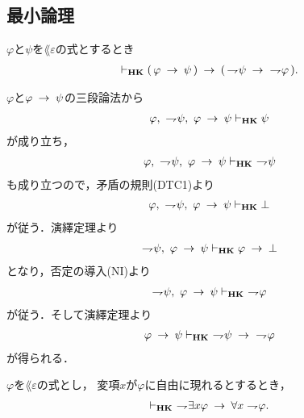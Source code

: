 \subsection{最小論理}
	\begin{screen}
		\begin{thm}[対偶律$1$]\label{classic:contraposition_1}
			$\varphi$と$\psi$を$\lang{\varepsilon}$の式とするとき
			\begin{align}
				\vdash_{{\scriptsize \mbox{{\bf HK}}}} (\, \varphi \hspace{0.25em}\rightarrow\hspace{0.25em} \psi\, )
				\hspace{0.25em}\rightarrow\hspace{0.25em} (\, \rightharpoondown\hspace{-0.25em} \psi \hspace{0.25em}\rightarrow\hspace{0.25em}\ \rightharpoondown\hspace{-0.25em} \varphi\, ).
			\end{align}
		\end{thm}
	\end{screen}
	
	\begin{sketch}
		$\varphi$と$\varphi \hspace{0.25em}\rightarrow\hspace{0.25em} \psi$の三段論法から
		\begin{align}
			\varphi,\ \rightharpoondown\hspace{-0.25em} \psi,\ \varphi \hspace{0.25em}\rightarrow\hspace{0.25em} \psi
			\vdash_{{\scriptsize \mbox{{\bf HK}}}} \psi
		\end{align}
		が成り立ち，
		\begin{align}
			\varphi,\ \rightharpoondown\hspace{-0.25em} \psi,\ \varphi \hspace{0.25em}\rightarrow\hspace{0.25em} \psi
			\vdash_{{\scriptsize \mbox{{\bf HK}}}}\ \rightharpoondown\hspace{-0.25em} \psi
		\end{align}
		も成り立つので，矛盾の規則(DTC1)より
		\begin{align}
			\varphi,\ \rightharpoondown\hspace{-0.25em} \psi,\ \varphi \hspace{0.25em}\rightarrow\hspace{0.25em} \psi
			\vdash_{{\scriptsize \mbox{{\bf HK}}}} \bot
		\end{align}
		が従う．演繹定理より
		\begin{align}
			\rightharpoondown\hspace{-0.25em} \psi,\ \varphi \hspace{0.25em}\rightarrow\hspace{0.25em} \psi
			\vdash_{{\scriptsize \mbox{{\bf HK}}}} \varphi \hspace{0.25em}\rightarrow\hspace{0.25em} \bot
		\end{align}
		となり，否定の導入(NI)より
		\begin{align}
			\rightharpoondown\hspace{-0.25em} \psi,\ \varphi \hspace{0.25em}\rightarrow\hspace{0.25em} \psi
			\vdash_{{\scriptsize \mbox{{\bf HK}}}}\ \rightharpoondown\hspace{-0.25em} \varphi
		\end{align}
		が従う．そして演繹定理より
		\begin{align}
			\varphi \rarrow \psi
			\provable{\mbox{{\bf HK}}}\ \negation \psi \rarrow\ \negation \varphi
		\end{align}
		が得られる．
		\QED
	\end{sketch}
	
	\begin{screen}
		\begin{thm}
		\label{classic:weak_De_Morgan_law_for_quantifier_1}
			$\varphi$を$\lang{\varepsilon}$の式とし，
			変項$x$が$\varphi$に自由に現れるとするとき，
			\begin{align}
				\vdash_{{\scriptsize \mbox{{\bf HK}}}}
				\ \rightharpoondown\hspace{-0.25em} \exists x \varphi \hspace{0.25em}\rightarrow\hspace{0.25em} \forall x \rightharpoondown\hspace{-0.25em} \varphi.
			\end{align}
		\end{thm}
	\end{screen}
	
